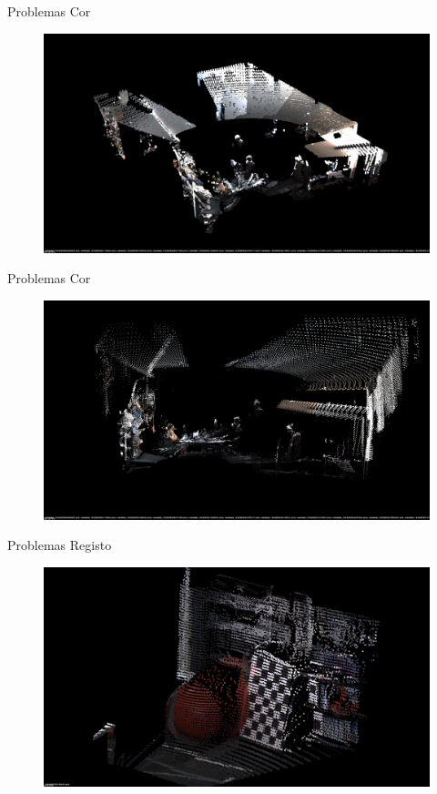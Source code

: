 \begin{frame}{Problemas Cor}

    \begin{figure}
        \centering
        \includegraphics[width=1\textwidth]{img/color_errors_1.png}
    \end{figure}
    
\end{frame}

\begin{frame}{Problemas Cor}

    \begin{figure}
        \centering
        \includegraphics[width=1\textwidth]{img/color_errors_2.png}
    \end{figure}
    
\end{frame}

\begin{frame}{Problemas Registo}

    \begin{figure}
        \centering
        \includegraphics[width=1\textwidth]{img/radlocc_bad_regist.png}
    \end{figure}
    
\end{frame}